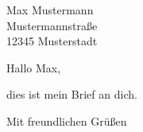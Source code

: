 \documentclass[%
foldmarks=P,%
version=last,%
fromalign=right,%
absender%
]{scrlttr2}
\begin{document}

\begin{letter}{%
Max Mustermann\\
Mustermannstraße\\
12345 Musterstadt
}
\opening{Hallo Max,}

dies ist mein Brief an dich.

\closing{
Mit freundlichen Grüßen
}




\end{letter}
\end{document}
